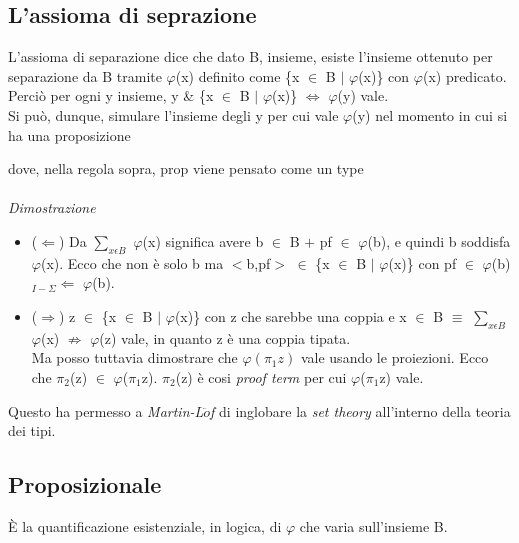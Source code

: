\subsection{L'assioma di seprazione}
\label{subsec:assioma-di-separazione}
L'assioma di separazione dice che dato B, insieme, esiste l'insieme ottenuto per separazione da B tramite $\varphi$(x) definito come  \{x $\in$ B $|$ $\varphi$(x)\} con $\varphi$(x) predicato.\\
Perci\`o per ogni y insieme, y \& \{x $\in$ B $|$ $\varphi$(x)\} $\Leftrightarrow$ $\varphi$(y) vale.\\
Si pu\`o, dunque, simulare l'insieme degli y per cui vale $\varphi$(y) nel momento in cui si ha una proposizione 
\begin{prooftree}
\end{prooftree}
\noindent
dove, nella regola sopra, prop viene pensato come un type\\\\
\noindent
\textit{Dimostrazione}
\begin{itemize}
\item ($\Leftarrow$) Da $\sum\limits_{x \epsilon B}$ $\varphi$(x) significa avere b $\in$ B $+$ pf $\in$ $\varphi$(b), e quindi b soddisfa $\varphi$(x). Ecco che non \`e solo b ma $<$b,pf$>$ $\in$ \{x $\in$ B $|$ $\varphi$(x)\} con pf $\in$ $\varphi$(b) $_{I-\Sigma}\Leftarrow$ $\varphi$(b).\\
\item ($\Rightarrow$) z $\in$ \{x $\in$ B $|$ $\varphi$(x)\} con z che sarebbe una coppia e x $\in$ B $\equiv$ $\sum\limits_{x \epsilon B}$ $\varphi$(x) $\nRightarrow$ $\varphi$(z) vale, in quanto z \`e una coppia tipata.\\ 
Ma posso tuttavia dimostrare che $\varphi(\pi_1z)$ vale usando le proiezioni. Ecco che $\pi_2$(z) $\in$ $\varphi$($\pi_1$z). $\pi_2$(z) \`e cosi \textit{proof term} per cui $\varphi$($\pi_1$z) vale.
\end{itemize}
\noindent
Questo ha permesso a \textit{Martin-L$\ddot{o}$f} di inglobare la \textit{set theory} all'interno della teoria dei tipi.

\subsection{Proposizionale}
\label{subsec:proposizionale}
\begin{prooftree}
\end{prooftree}
\noindent
\`E la quantificazione esistenziale, in logica, di $\varphi$ che varia sull'insieme B.\\
\noindent

